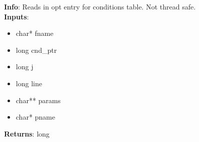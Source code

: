 \textbf{Info}: Reads in opt entry for conditions table. Not thread safe. \\

\noindent \textbf{Inputs}:
\begin{itemize}
\item{char* fname}
\item{long cnd\_ptr}
\item{long j}
\item{long line}
\item{char** params}
\item{char* pname}
\end{itemize}

\noindent \textbf{Returns}: long
